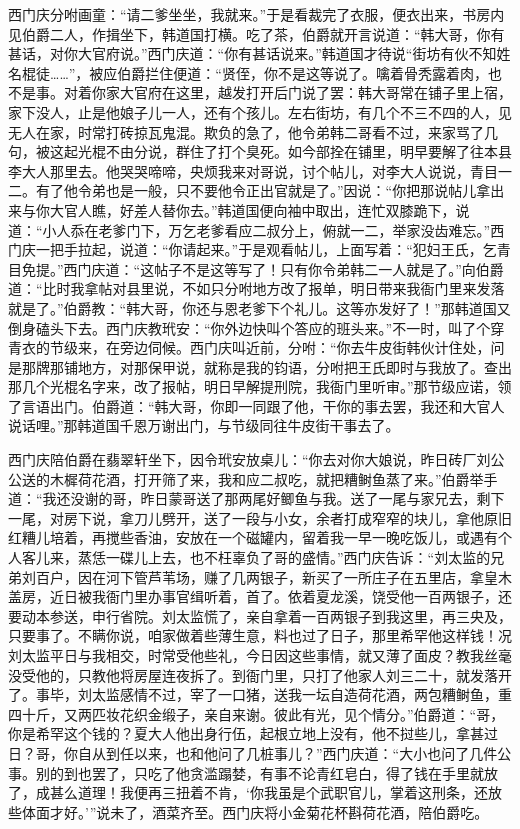 西门庆分咐画童：“请二爹坐坐，我就来。”于是看裁完了衣服，便衣出来，书房内见伯爵二人，作揖坐下，韩道国打横。吃了茶，伯爵就开言说道：“韩大哥，你有甚话，对你大官府说。”西门庆道：“你有甚话说来。”韩道国才待说“街坊有伙不知姓名棍徒……”，被应伯爵拦住便道：“贤侄，你不是这等说了。噙着骨秃露着肉，也不是事。对着你家大官府在这里，越发打开后门说了罢：韩大哥常在铺子里上宿，家下没人，止是他娘子儿一人，还有个孩儿。左右街坊，有几个不三不四的人，见无人在家，时常打砖掠瓦鬼混。欺负的急了，他令弟韩二哥看不过，来家骂了几句，被这起光棍不由分说，群住了打个臭死。如今部拴在铺里，明早要解了往本县李大人那里去。他哭哭啼啼，央烦我来对哥说，讨个帖儿，对李大人说说，青目一二。有了他令弟也是一般，只不要他令正出官就是了。”因说：“你把那说帖儿拿出来与你大官人瞧，好差人替你去。”韩道国便向袖中取出，连忙双膝跪下，说道：“小人忝在老爹门下，万乞老爹看应二叔分上，俯就一二，举家没齿难忘。”西门庆一把手拉起，说道：“你请起来。”于是观看帖儿，上面写着：“犯妇王氏，乞青目免提。”西门庆道：“这帖子不是这等写了！只有你令弟韩二一人就是了。”向伯爵道：“比时我拿帖对县里说，不如只分咐地方改了报单，明日带来我衙门里来发落就是了。”伯爵教：“韩大哥，你还与恩老爹下个礼儿。这等亦发好了！”那韩道国又倒身磕头下去。西门庆教玳安：“你外边快叫个答应的班头来。”不一时，叫了个穿青衣的节级来，在旁边伺候。西门庆叫近前，分咐：“你去牛皮街韩伙计住处，问是那牌那铺地方，对那保甲说，就称是我的钧语，分咐把王氏即时与我放了。查出那几个光棍名字来，改了报帖，明日早解提刑院，我衙门里听审。”那节级应诺，领了言语出门。伯爵道：“韩大哥，你即一同跟了他，干你的事去罢，我还和大官人说话哩。”那韩道国千恩万谢出门，与节级同往牛皮街干事去了。

西门庆陪伯爵在翡翠轩坐下，因令玳安放桌儿：“你去对你大娘说，昨日砖厂刘公公送的木樨荷花酒，打开筛了来，我和应二叔吃，就把糟鲥鱼蒸了来。”伯爵举手道：“我还没谢的哥，昨日蒙哥送了那两尾好鲫鱼与我。送了一尾与家兄去，剩下一尾，对房下说，拿刀儿劈开，送了一段与小女，余者打成窄窄的块儿，拿他原旧红糟儿培着，再搅些香油，安放在一个磁罐内，留着我一早一晚吃饭儿，或遇有个人客儿来，蒸恁一碟儿上去，也不枉辜负了哥的盛情。”西门庆告诉：“刘太监的兄弟刘百户，因在河下管芦苇场，赚了几两银子，新买了一所庄子在五里店，拿皇木盖房，近日被我衙门里办事官缉听着，首了。依着夏龙溪，饶受他一百两银子，还要动本参送，申行省院。刘太监慌了，亲自拿着一百两银子到我这里，再三央及，只要事了。不瞒你说，咱家做着些薄生意，料也过了日子，那里希罕他这样钱！况刘太监平日与我相交，时常受他些礼，今日因这些事情，就又薄了面皮？教我丝毫没受他的，只教他将房屋连夜拆了。到衙门里，只打了他家人刘三二十，就发落开了。事毕，刘太监感情不过，宰了一口猪，送我一坛自造荷花酒，两包糟鲥鱼，重四十斤，又两匹妆花织金缎子，亲自来谢。彼此有光，见个情分。”伯爵道：“哥，你是希罕这个钱的？夏大人他出身行伍，起根立地上没有，他不挝些儿，拿甚过日？哥，你自从到任以来，也和他问了几桩事儿？”西门庆道：“大小也问了几件公事。别的到也罢了，只吃了他贪滥蹋婪，有事不论青红皂白，得了钱在手里就放了，成甚么道理！我便再三扭着不肯，‘你我虽是个武职官儿，掌着这刑条，还放些体面才好。’”说未了，酒菜齐至。西门庆将小金菊花杯斟荷花酒，陪伯爵吃。

